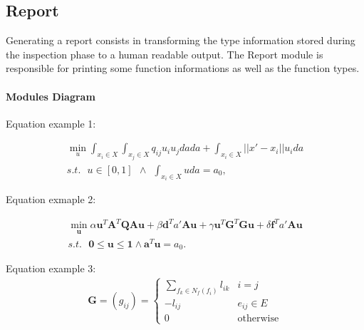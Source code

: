 \subsection*{Report}
Generating a report consists in transforming the type information stored during the inspection phase to a human readable output. The Report module is responsible for printing some function informations as well as the function types.

\paragraph*{Modules Diagram}






Equation example 1:

\begin{equation}
\begin{split}
\min_u \int_{x_i\in X}\int_{x_j\in X} q_{ij} u_i u_j da da + \int_{x_i\in X}||x' - x_i|| u_i da \\
s.t. \ \ \ u\in[0,1] \ \ \land  \ \ \int_{x_i\in X}u da = a_0,
\end{split}
\end{equation}

Equation exmaple 2:

\begin{equation}
\begin{split}
\min_{\mathbf{u}} \alpha \mathbf{u}^T \mathbf{A}^T \mathbf{Q} \mathbf{A} \mathbf{u} +  \beta \mathbf{d}^T a' \mathbf{A} \mathbf{u} + \gamma \mathbf{u}^T \mathbf{G}^T \mathbf{G} \mathbf{u} + \delta\mathbf{f}^T a' \mathbf{A} \mathbf{u} \\
s.t. \ \ \ \mathbf{0} \leq \mathbf{u} \leq \mathbf{1} \land \mathbf{a}^T\mathbf{u}=a_0.
\end{split}
\end{equation}

Equation example 3:
\begin{align}
\mathbf{G}=(g_{ij}) = \left\lbrace
\begin{array}{ll}
\sum_{f_k\in N_f(f_i)} l_{ik} & i=j\\
-l_{ij} & e_{ij}\in E\\
0 & \text{otherwise}
\end{array}
\right.
\end{align}

% 

